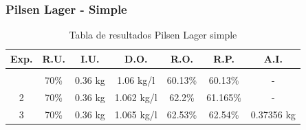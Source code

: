         \subsubsection{Pilsen Lager - Simple}
        
        \begin{longtable}{|p{1cm}|p{1.7cm}|p{2cm}|p{2cm}|p{2cm}| p{1cm}| p{1cm}|}
        \hline
        Exp. %
        & \multicolumn{1}{c|}{R.U.} %
        & \multicolumn{1}{c|}{I.U.} %
        & \multicolumn{1}{c|}{D.O.} %
        & \multicolumn{1}{c|}{R.O.} %
        & \multicolumn{1}{c|}{R.P.} %
        & \multicolumn{1}{c|}{A.I.} %
        \\
        \endfirsthead
        
        \endhead
 
        \endfoot
        
        \hline
        \caption{Tabla de resultados Pilsen Lager simple\label{tab:ResultadosPilsenSimple}}\\
        \endlastfoot
        \hline
             \multicolumn{1}{|c|}{1} 
             & \multicolumn{1}{c|}{70\%} %
             & \multicolumn{1}{c|}{0.36 kg} %
             & \multicolumn{1}{c|}{1.06 kg/l } %
             & \multicolumn{1}{c|}{60.13\%} %
             & \multicolumn{1}{c|}{60.13\%} %
             & \multicolumn{1}{c|}{-} %
             \\
             \hline
             
             \multicolumn{1}{|c|}{2} 
             & \multicolumn{1}{c|}{70\%} %
             & \multicolumn{1}{c|}{0.36 kg} %
             & \multicolumn{1}{c|}{1.062 kg/l} %
             & \multicolumn{1}{c|}{62.2\%} %
             &\multicolumn{1}{c|}{61.165\%} %
             &\multicolumn{1}{c|}{-} %
             
             \\
             \hline
             
             \multicolumn{1}{|c|}{3} 
             & \multicolumn{1}{c|}{70\%} %
             & \multicolumn{1}{c|}{0.36 kg} %
             & \multicolumn{1}{c|}{1.065 kg/l} %
             & \multicolumn{1}{c|}{62.53\%} %
             &\multicolumn{1}{c|}{62.54\%} %
             &\multicolumn{1}{c|}{0.37356 kg} %
             

\end{longtable}

